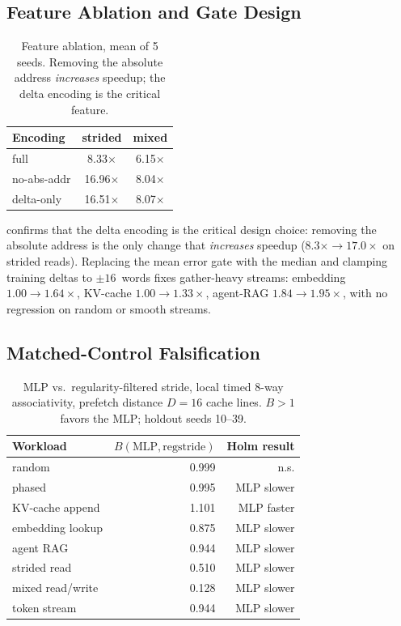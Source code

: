 \documentclass[conference]{IEEEtran}
\begin{document}
\subsection{Feature Ablation and Gate Design}

\begin{table}[t]
\centering
\caption{Feature ablation, mean of 5 seeds. Removing the absolute address
\emph{increases} speedup; the delta encoding is the critical feature.}
\label{tab:ablation}
\begin{tabular}{@{}l cc@{}}
\toprule
Encoding & strided & mixed \\
\midrule
full          & 8.33$\times$  & 6.15$\times$ \\
no-abs-addr   & 16.96$\times$ & 8.04$\times$ \\
delta-only    & 16.51$\times$ & 8.07$\times$ \\
\bottomrule
\end{tabular}
\end{table}

 confirms that the delta encoding is the critical design
choice: removing the absolute address is the only change that
\emph{increases} speedup ($8.3\times \to 17.0\times$ on strided reads).
Replacing the mean error gate with the median and clamping training deltas
to ${\pm}16$~words fixes gather-heavy streams: embedding
$1.00 \to 1.64\times$, KV-cache $1.00 \to 1.33\times$, agent-RAG
$1.84 \to 1.95\times$, with no regression on random or smooth streams.

\subsection{Matched-Control Falsification}
\label{sec:falsification}

\begin{table}[t]
\centering
\caption{MLP vs.\ regularity-filtered stride, local timed 8-way associativity,
prefetch distance $D=16$ cache lines.
$B > 1$ favors the MLP; holdout seeds 10--39.}
\label{tab:matched}
\begin{tabular}{@{}l rr@{}}
\toprule
Workload & $B(\text{MLP}, \text{regstride})$ & Holm result \\
\midrule
random             & 0.999 & n.s. \\
phased             & 0.995 & MLP slower \\
KV-cache append    & 1.101 & MLP faster \\
embedding lookup   & 0.875 & MLP slower \\
agent RAG          & 0.944 & MLP slower \\
strided read       & 0.510 & MLP slower \\
mixed read/write   & 0.128 & MLP slower \\
token stream       & 0.944 & MLP slower \\
\bottomrule
\end{tabular}
\end{table}
\end{document}
